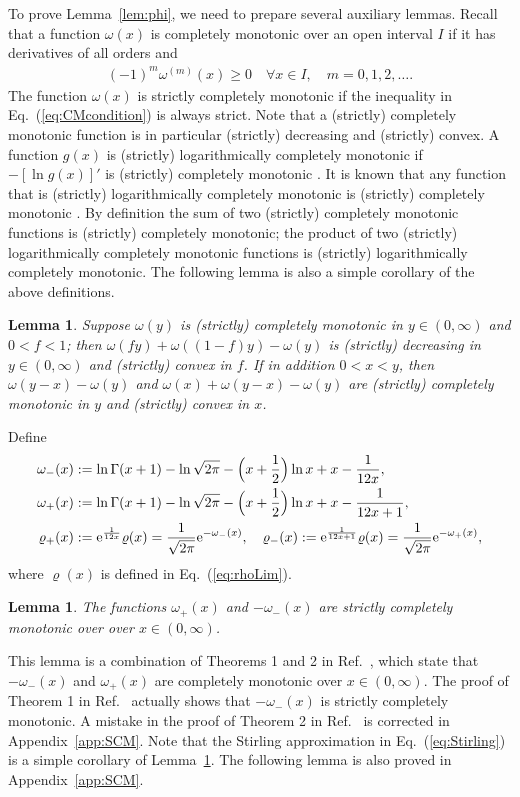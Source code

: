 \documentclass[aop]{imsart}
\theoremstyle{plain}
\newtheorem{lemma}[theorem]{Lemma}
\theoremstyle{remark}
\newcommand{\rme}{\mathrm{e}}
\newcommand{\1}{\operatorname{\uppercase\expandafter{\romannumeral1}}}
\newcommand{\2}{\operatorname{\uppercase\expandafter{\romannumeral2}}}
\newcommand{\3}{\operatorname{\uppercase\expandafter{\romannumeral3}}}
\newcommand{\4}{\operatorname{\uppercase\expandafter{\romannumeral4}}}
\newcommand{\5}{\operatorname{\uppercase\expandafter{\romannumeral5}}}
\newcommand{\6}{\operatorname{\uppercase\expandafter{\romannumeral6}}}
\newcommand{\7}{\operatorname{\uppercase\expandafter{\romannumeral7}}}
\newcommand{\8}{\operatorname{\uppercase\expandafter{\romannumeral8}}}
\newcommand{\9}{\operatorname{\uppercase\expandafter{\romannumeral9}}}
\newcommand{\eref}[1]{Eq.~\textup{(\ref{#1})}}
\newcommand{\lref}[1]{Lemma~\ref{#1}}
\newcommand{\rcite}[1]{Ref.~\cite{#1}}
\newcommand{\aref}[1]{Appendix~\ref{#1}}
\begin{document}
To prove \lref{lem:phi}, we need to prepare several auxiliary  lemmas. 
Recall that a function $\omega(x)$ is  completely monotonic \cite{SchiSV12} over an open interval $I$ if it has derivatives of all orders and 
\begin{align}
(-1)^m\omega^{(m)}(x)\geq 0\quad \forall x\in I,\quad  m=0,1,2,\ldots.  \label{eq:CMcondition}
\end{align}
The function  $\omega(x)$ is strictly completely monotonic if the inequality in \eref{eq:CMcondition} is always strict. Note that a (strictly) completely monotonic function is  in particular (strictly) decreasing and (strictly) convex. A function $g(x)$  is  (strictly) logarithmically completely monotonic if $-[\ln g(x)]'$ is (strictly) completely monotonic \cite{SchiSV12}. It is known that any function that is (strictly) logarithmically completely monotonic  is (strictly) completely monotonic \cite{QiC04}. By definition the sum of two (strictly) completely monotonic functions is (strictly) completely monotonic; the product of two (strictly) logarithmically completely monotonic functions is (strictly) logarithmically completely monotonic. The following lemma is also a simple corollary of the above definitions. 

\begin{lemma}\label{lem:SCM}
 Suppose $\omega(y)$ is (strictly) completely monotonic in $y\in (0,\infty)$ and $0<f<1$; then $\omega(fy)+\omega((1-f)y)-\omega(y)$ is (strictly) decreasing in $y\in (0,\infty)$ and (strictly) convex in $f$. If in addition $0<x<y$, then $\omega(y-x)-\omega(y)$ and 
$\omega(x)+\omega(y-x)-\omega(y)$ are (strictly) completely monotonic in $y$ and (strictly) convex in $x$. 
\end{lemma}



 Define
\begin{align}
\omega_-(x)&:=\ln \Gamma(x+1)-\ln\sqrt{2\pi}-\Bigl(x+\frac{1}{2}\Bigr)\ln x+x-\frac{1}{12x},\\
\omega_+(x)&:=\ln \Gamma(x+1)-\ln\sqrt{2\pi}-\Bigl(x+\frac{1}{2}\Bigr)\ln x+x-\frac{1}{12x+1}, \\
\varrho_+(x)&:=\rme^{\frac{1}{12x}}\varrho(x)=\frac{1}{\sqrt{2\pi}} \rme^{-\omega_-(x)}
,\quad \varrho_-(x):=\rme^{\frac{1}{12x+1}}\varrho(x)=\frac{1}{\sqrt{2\pi}} \rme^{-\omega_+(x)}, \label{eq:varrhopm}
\end{align}
where $\varrho(x)$ is defined in \eref{eq:rhoLim}.


\begin{lemma}\label{lem:SCMomega}
	The functions $\omega_+(x)$ and $-\omega_-(x)$ are strictly completely monotonic over over $x\in (0,\infty)$. 
\end{lemma}
This lemma is a combination of Theorems 1 and 2 in  \rcite{Mort10}, which state that $-\omega_-(x)$ and $\omega_+(x)$  are  completely monotonic  over $x\in (0,\infty)$. The proof of Theorem 1  in  \rcite{Mort10} actually shows that  $-\omega_-(x)$ is strictly completely monotonic. A mistake in the proof of Theorem 2 in  \rcite{Mort10} is corrected in \aref{app:SCM}. Note that the Stirling approximation in 
\eref{eq:Stirling} is a simple corollary of 
\lref{lem:SCMomega}.
The following lemma is also proved in \aref{app:SCM}.
\end{document}
